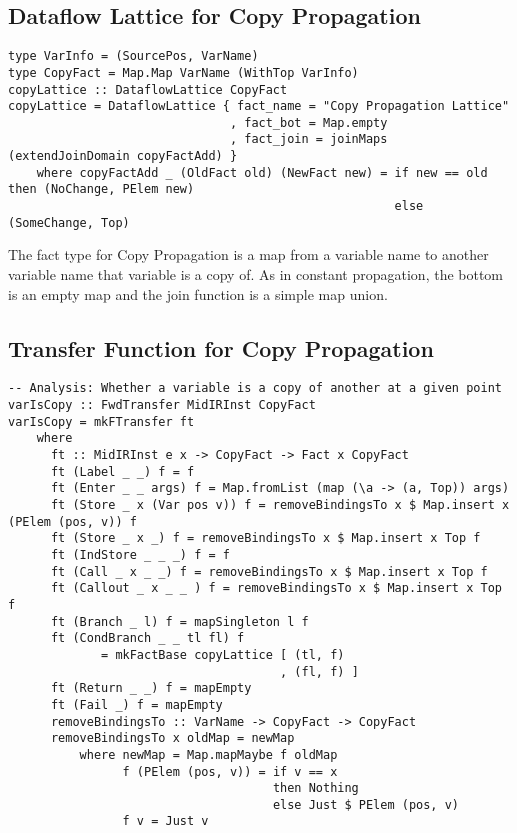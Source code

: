 \documentclass[11pt]{article}
\begin{document}
\subsection { Dataflow Lattice for Copy Propagation }

{\small\begin{verbatim}
type VarInfo = (SourcePos, VarName)
type CopyFact = Map.Map VarName (WithTop VarInfo)
copyLattice :: DataflowLattice CopyFact
copyLattice = DataflowLattice { fact_name = "Copy Propagation Lattice"
                               , fact_bot = Map.empty
                               , fact_join = joinMaps (extendJoinDomain copyFactAdd) }
    where copyFactAdd _ (OldFact old) (NewFact new) = if new == old then (NoChange, PElem new)
                                                      else (SomeChange, Top)
\end{verbatim}}

The fact type for Copy Propagation is a map from a variable name to another variable name that variable is a copy of. As in constant propagation, the bottom is an empty map and the join function is a simple map union. 

\subsection { Transfer Function for Copy Propagation }

\begin{verbatim}
-- Analysis: Whether a variable is a copy of another at a given point 
varIsCopy :: FwdTransfer MidIRInst CopyFact 
varIsCopy = mkFTransfer ft 
    where 
      ft :: MidIRInst e x -> CopyFact -> Fact x CopyFact 
      ft (Label _ _) f = f 
      ft (Enter _ _ args) f = Map.fromList (map (\a -> (a, Top)) args)
      ft (Store _ x (Var pos v)) f = removeBindingsTo x $ Map.insert x (PElem (pos, v)) f 
      ft (Store _ x _) f = removeBindingsTo x $ Map.insert x Top f 
      ft (IndStore _ _ _) f = f 
      ft (Call _ x _ _) f = removeBindingsTo x $ Map.insert x Top f 
      ft (Callout _ x _ _ ) f = removeBindingsTo x $ Map.insert x Top f 
      ft (Branch _ l) f = mapSingleton l f 
      ft (CondBranch _ _ tl fl) f 
             = mkFactBase copyLattice [ (tl, f)
                                      , (fl, f) ]
      ft (Return _ _) f = mapEmpty 
      ft (Fail _) f = mapEmpty 
      removeBindingsTo :: VarName -> CopyFact -> CopyFact 
      removeBindingsTo x oldMap = newMap 
          where newMap = Map.mapMaybe f oldMap 
                f (PElem (pos, v)) = if v == x 
                                     then Nothing 
                                     else Just $ PElem (pos, v)
                f v = Just v
\end{verbatim}
\end{document}
